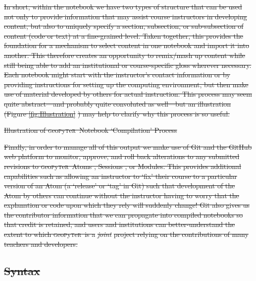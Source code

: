 \documentclass[letter, 11pt,titlepage]{article}
\newcommand{\gp}{\textsc{g}eo\textsc{p}y\textsc{t}e\textsc{r}~\/}
\providecommand{\DIFaddtex}[1]{{\protect\color{blue}\uwave{#1}}} %
\providecommand{\DIFdeltex}[1]{{\protect\color{red}\sout{#1}}}                      %
\providecommand{\DIFaddbegin}{} %
\providecommand{\DIFaddend}{} %
\providecommand{\DIFdelend}{} %
\providecommand{\DIFdelFL}[1]{\DIFdel{#1}} %
\providecommand{\DIFadd}[1]{\texorpdfstring{\DIFaddtex{#1}}{#1}} %
\providecommand{\DIFdel}[1]{\texorpdfstring{\DIFdeltex{#1}}{}} %
\newcommand{\DIFaddincludegraphics}[2][]{{\color{blue}\fbox{\DIFOincludegraphics[#1]{#2}}}} %
\DeclareRobustCommand{\DIFaddbegin}{\DIFOaddbegin \let\includegraphics\DIFaddincludegraphics} %
\DeclareRobustCommand{\DIFaddend}{\DIFOaddend \let\includegraphics\DIFOincludegraphics} %
\DeclareRobustCommand{\DIFdelend}{\DIFOaddend \let\includegraphics\DIFOincludegraphics} %
\begin{document}
\DIFdel{In short, within the notebook we have two types of structure that can be used
not only to provide information that may assist course instructors in developing
content, but also to uniquely specify a section, subsection, or sub-subsection
of content (code or text) at a fine-grained level. Taken together, this provides
the foundation for a mechanism to select content in one notebook and import it
into another. This therefore creates an opportunity to remix/mash up content
while still being able to add an institutional or course-specific gloss wherever
necessary. Each notebook might start with the instructor's contact information
or by providing instructions for setting up the computing environment, but then
make use of material developed by others for actual instruction. This process
may seem quite abstract---and probably quite convoluted as well---but an
illustration (Figure \ref{fig:Illustration} }%
\DIFdel{)
may help to clarify why this process is so useful.
}%

{%
\DIFdelFL{Illustration of \gp Notebook `Compilation' Process}}

\DIFdel{Finally, in order to manage all of this output we make use of Git and the GitHub
web platform to monitor, approve, and roll back alterations to any submitted
revisions to \gp Atoms , Sessions , or Modules. This provides additional
capabilities such as allowing an instructor to `fix' their course to a
particular version of an Atom (a `release' or `tag' in Git) such that
development of the Atom by others can continue without the instructor having to
worry that the explanation or code upon which they rely will suddenly change!
Git also gives us the contributor information that we can propagate into
compiled notebooks so that credit is retained, and users and institutions can
better-understand the extent to which \gp is a }\emph{\DIFdel{joint}} %
\DIFdel{project relying on
the contributions of many teachers and developers.
}%

\subsection{\DIFdel{Syntax}}%
\addtocounter{subsection}{-1}%
\DIFdelend \DIFaddbegin \subsection{\DIFadd{Approach}}
\DIFaddend 
\end{document}
